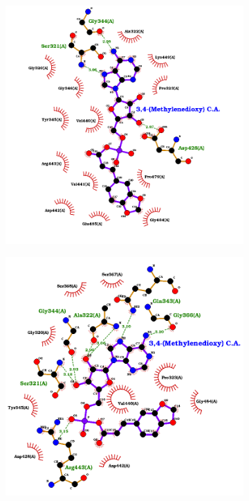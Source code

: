 \documentclass[12pt]{article}
\begin{document}
\begin{figure}[h!]
\begin{subfigure}[h!]{0.35\textwidth}
			\caption{}
		\end{subfigure}
		\hfill
		\begin{subfigure}[h!]{0.35\textwidth}
			\hspace{2cm}
			\includegraphics[width=\textwidth]{../6/known/Dock/best3.png}
			\caption{}
		\end{subfigure}
		\hfill
		\begin{subfigure}[h!]{0.35\textwidth}
			\hspace{-2cm}
			\includegraphics[width=\textwidth]{../6/known/Dock/best4.png}

\end{subfigure}
\end{figure}
\end{document}
